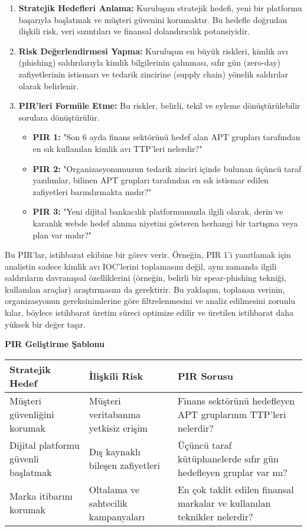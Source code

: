 \begin{enumerate}
    \item \textbf{Stratejik Hedefleri Anlama:} Kuruluşun stratejik hedefi, yeni bir platformu başarıyla başlatmak ve müşteri güvenini korumaktır. Bu hedefle doğrudan ilişkili risk, veri sızıntıları ve finansal dolandırıcılık potansiyidir.
    \item \textbf{Risk Değerlendirmesi Yapma:} Kuruluşun en büyük riskleri, kimlik avı (phishing) saldırılarıyla kimlik bilgilerinin çalınması, sıfır gün (zero-day) zafiyetlerinin istismarı ve tedarik zincirine (supply chain) yönelik saldırılar olarak belirlenir.
    \item \textbf{PIR'leri Formüle Etme:} Bu riskler, belirli, tekil ve eyleme dönüştürülebilir sorulara dönüştürülür.
    \begin{itemize}
        \item \textbf{PIR 1:} "Son 6 ayda finans sektörünü hedef alan APT grupları tarafından en sık kullanılan kimlik avı TTP'leri nelerdir?"
        \item \textbf{PIR 2:} "Organizasyonumuzun tedarik zinciri içinde bulunan üçüncü taraf yazılımlar, bilinen APT grupları tarafından en sık istismar edilen zafiyetleri barındırmakta mıdır?"
        \item \textbf{PIR 3:} "Yeni dijital bankacılık platformumuzla ilgili olarak, derin ve karanlık webde hedef alınma niyetini gösteren herhangi bir tartışma veya plan var mıdır?"
    \end{itemize}
\end{enumerate}

Bu PIR'lar, istihbarat ekibine bir görev verir. Örneğin, PIR 1'i yanıtlamak için analistin sadece kimlik avı IOC'lerini toplamasını değil, aynı zamanda ilgili saldırıların davranışsal özelliklerini (örneğin, belirli bir spear-phishing tekniği, kullanılan araçlar) araştırmasını da gerektirir. Bu yaklaşım, toplanan verinin, organizasyonun gereksinimlerine göre filtrelenmesini ve analiz edilmesini zorunlu kılar, böylece istihbarat üretim süreci optimize edilir ve üretilen istihbarat daha yüksek bir değer taşır.

\textbf{PIR Geliştirme Şablonu}

\begin{longtable}{|p{4cm}|p{5cm}|p{6cm}|}
\hline
\textbf{Stratejik Hedef} & \textbf{İlişkili Risk} & \textbf{PIR Sorusu} \\
\hline
Müşteri güvenliğini korumak & Müşteri veritabanına yetkisiz erişim & Finans sektörünü hedefleyen APT gruplarının TTP'leri nelerdir? \\
\hline
Dijital platformu güvenli başlatmak & Dış kaynaklı bileşen zafiyetleri & Üçüncü taraf kütüphanelerde sıfır gün hedefleyen gruplar var mı? \\
\hline
Marka itibarını korumak & Oltalama ve sahtecilik kampanyaları & En çok taklit edilen finansal markalar ve kullanılan teknikler nelerdir? \\
\hline
\end{longtable}

